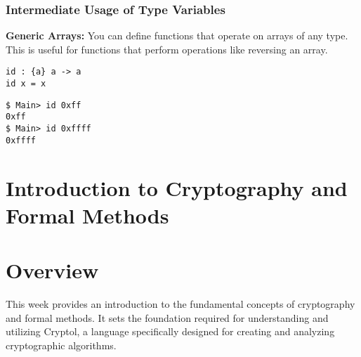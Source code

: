 \newpage
\subsubsection{Intermediate Usage of Type Variables}
\textbf{Generic Arrays:} You can define functions that operate on arrays of any type. This is useful for functions that perform operations like reversing an array.
\begin{lstlisting}[style=cryptol]
id : {a} a -> a
id x = x
\end{lstlisting}
\begin{lstlisting}[style=zsh]
$ Main> id 0xff
0xff
$ Main> id 0xffff
0xffff
\end{lstlisting}



\newpage
\iffalse
%
%
%
%
\section{Introduction to Cryptography and Formal Methods}
%
\section*{Overview}
This week provides an introduction to the fundamental concepts of cryptography and formal methods. It sets the foundation required for understanding and utilizing Cryptol, a language specifically designed for creating and analyzing cryptographic algorithms.

